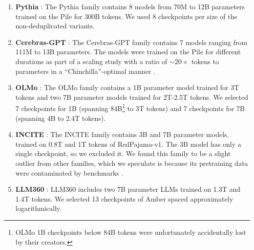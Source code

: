 \begin{enumerate}
    \item \textbf{Pythia} \citep{biderman2023pythia}: The Pythia family contains 8 models from 70M to 12B parameters trained on the Pile \citep{gao2020pile} for 300B tokens. %
    We used 8 checkpoints per size of the non-deduplicated variants.%
    \item \textbf{Cerebras-GPT} \citep{dey2023cerebrasgpt}: The Cerebras-GPT family contains 7 models ranging from 111M to 13B parameters. %
    The models were trained on the Pile \citep{gao2020pile} for different durations as part of a scaling study with a ratio of $\sim 20 \times$ tokens to parameters in a ``Chinchilla''-optimal manner \citep{hoffmann2022training}.
    \item \textbf{OLMo} \citep{groeneveld2024olmo}: The OLMo family contains a 1B parameter model trained for 3T tokens and two 7B parameter models trained for 2T-2.5T tokens. We selected 7 checkpoints for 1B (spanning 84B\footnote{OLMo 1B checkpoints below 84B tokens were unfortunately accidentally lost by their creators.} to 3T tokens) and 7 checkpoints for 7B (spanning 4B to 2.4T tokens).
    \item \textbf{INCITE} \citep{together2023incite}: The INCITE family contains 3B and 7B parameter models, trained on 0.8T and 1T tokens of RedPajama-v1\citep{together2023redpajama}. The 3B model has only a single checkpoint, so we excluded it. We found this family to be a slight outlier from other families, which we speculate is because its pretraining data were contaminated by benchmarks \citep{elazar2023whats}.
    \item \textbf{LLM360} \citep{liu2023llm360}:
    LLM360 includes two 7B parameter LLMs trained on 1.3T and 1.4T tokens. We selected 13 checkpoints of Amber spaced approximately logarithmically.
\end{enumerate}

